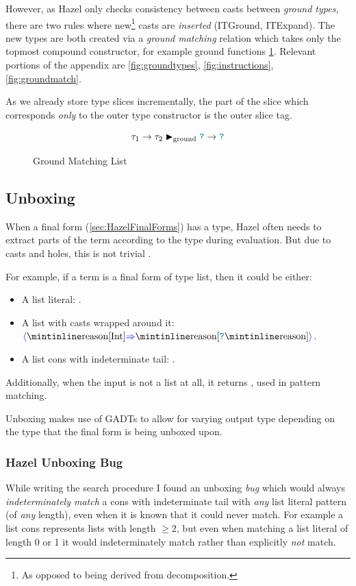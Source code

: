 However, as Hazel only checks consistency between casts between \textit{ground types}, there are two rules where new\footnote{As opposed to being derived from decomposition.} casts are \textit{inserted} (ITGround, ITExpand). The new types are both created via a \textit{ground matching} relation which takes only the topmost compound constructor, for example ground functions \cref{fig:GroundFunction}. Relevant portions of the appendix are \cref{fig:groundtypes}, \cref{fig:instructions}, \cref{fig:groundmatch}.

As we already store type slices incrementally, the part of the slice which corresponds \textit{only} to the outer type constructor is the outer slice tag.

\begin{figure}
\[\tau_1 \to \tau_2 \blacktriangleright_{\text{ground}} {\color{teal}\texttt{?}} \to {\color{teal}\texttt{?}}\]
\caption{Ground Matching List}
\label{fig:GroundFunction}
\end{figure}

\subsection{Unboxing}
When a final form (\cref{sec:HazelFinalForms}) has a type, Hazel often needs to extract parts of the term according to the type during evaluation. But due to casts and holes, this is not trivial \cite{LivePatternMatching}.

For example, if a term is a final form of type list, then it could be either:
\begin{itemize}
\item A list literal: \code{[1,2,3]}.
\item A list with casts wrapped around it: \code{[1,2,3]}$\scast{\code{[Int]}}{\code{[}\dyn\code{]}}$.
\item A list cons with indeterminate tail: .
\end{itemize}
Additionally, when the input is not a list at all, it returns , used in pattern matching. 

Unboxing makes use of GADTs to allow for varying output type depending on the type that the final form is being unboxed upon.

\subsubsection{Hazel Unboxing Bug}
While writing the search procedure I found an unboxing \textit{bug} which would always \textit{indeterminately match} a cons with indeterminate tail with \textit{any} list literal pattern (of \textit{any} length), even when it is known that it could never match. For example a list cons  represents lists with length $\geq 2$, but even when matching a list literal of length 0 or 1 it would indeterminately match rather than explicitly \textit{not} match. 

